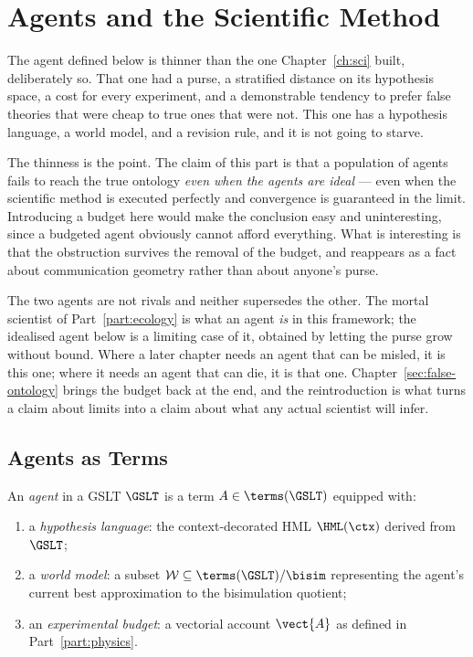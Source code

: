 \chapter{Agents and the Scientific Method}
\label{sec:agents}

The agent defined below is thinner than the one
Chapter~\ref{ch:sci} built, deliberately so.
That one had a purse, a stratified distance on its hypothesis space, a
cost for every experiment, and a demonstrable tendency to prefer false
theories that were cheap to true ones that were not.
This one has a hypothesis language, a world model, and a revision rule,
and it is not going to starve.

The thinness is the point.
The claim of this part is that a population of agents fails to reach the
true ontology \emph{even when the agents are ideal} --- even when the
scientific method is executed perfectly and convergence is guaranteed in
the limit.
Introducing a budget here would make the conclusion easy and
uninteresting, since a budgeted agent obviously cannot afford everything.
What is interesting is that the obstruction survives the removal of the
budget, and reappears as a fact about communication geometry rather than
about anyone's purse.

\begin{remark}
\label{rmk:two-agents}
The two agents are not rivals and neither supersedes the other.
The mortal scientist of Part~\ref{part:ecology} is what an agent
\emph{is} in this framework; the idealised agent below is a limiting case
of it, obtained by letting the purse grow without bound.
Where a later chapter needs an agent that can be misled, it is this one;
where it needs an agent that can die, it is that one.
Chapter~\ref{sec:false-ontology} brings the budget back at the end, and
the reintroduction is what turns a claim about limits into a claim about
what any actual scientist will infer.
\end{remark}

\bigskip

\section{Agents as Terms}

\begin{definition}[Agent]
An \emph{agent} in a GSLT $\GSLT$ is a term $A \in \terms(\GSLT)$
equipped with:
\begin{enumerate}[label=(\roman*)]
  \item a \emph{hypothesis language}: the context-decorated
        HML $\HML(\ctx)$ derived from $\GSLT$;
  \item a \emph{world model}: a subset $\mathcal{W} \subseteq
        \terms(\GSLT)/{\bisim}$ representing the agent's current
        best approximation to the bisimulation quotient;
  \item an \emph{experimental budget}: a vectorial account
        $\vect{A}$ as defined in Part~\ref{part:physics}.
\end{enumerate}
\end{definition}

